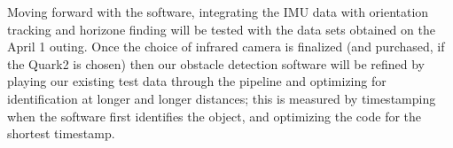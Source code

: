 Moving forward with the software, integrating the IMU data with orientation tracking and horizone finding will be tested with the data sets obtained on the April 1 outing. Once the choice of infrared camera is finalized (and purchased, if the Quark2 is chosen) then our obstacle detection software will be refined by playing our existing test data through the pipeline and optimizing for identification at longer and longer distances; this is measured by timestamping when the software first identifies the object, and optimizing the code for the shortest timestamp.
